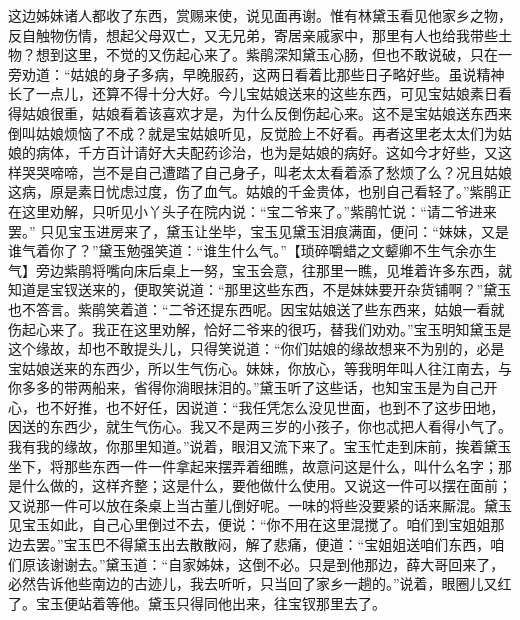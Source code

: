 \documentclass[12pt,oneside]{book}
\begin{document}
这边姊妹诸人都收了东西，赏赐来使，说见面再谢。惟有林黛玉看见他家乡之物，反自触物伤情，想起父母双亡，又无兄弟，寄居亲戚家中，那里有人也给我带些土物？想到这里，不觉的又伤起心来了。紫鹃深知黛玉心肠，但也不敢说破，只在一旁劝道：“姑娘的身子多病，早晚服药，这两日看着比那些日子略好些。虽说精神长了一点儿，还算不得十分大好。今儿宝姑娘送来的这些东西，可见宝姑娘素日看得姑娘很重，姑娘看着该喜欢才是，为什么反倒伤起心来。这不是宝姑娘送东西来倒叫姑娘烦恼了不成？就是宝姑娘听见，反觉脸上不好看。再者这里老太太们为姑娘的病体，千方百计请好大夫配药诊治，也为是姑娘的病好。这如今才好些，又这样哭哭啼啼，岂不是自己遭踏了自己身子，叫老太太看着添了愁烦了么？况且姑娘这病，原是素日忧虑过度，伤了血气。姑娘的千金贵体，也别自己看轻了。”紫鹃正在这里劝解，只听见小丫头子在院内说：“宝二爷来了。”紫鹃忙说：“请二爷进来罢。”
只见宝玉进房来了，黛玉让坐毕，宝玉见黛玉泪痕满面，便问：“妹妹，又是谁气着你了？”黛玉勉强笑道：“谁生什么气。”【琐碎嚼蜡之文颦卿不生气余亦生气】旁边紫鹃将嘴向床后桌上一努，宝玉会意，往那里一瞧，见堆着许多东西，就知道是宝钗送来的，便取笑说道：“那里这些东西，不是妹妹要开杂货铺啊？”黛玉也不答言。紫鹃笑着道：“二爷还提东西呢。因宝姑娘送了些东西来，姑娘一看就伤起心来了。我正在这里劝解，恰好二爷来的很巧，替我们劝劝。”宝玉明知黛玉是这个缘故，却也不敢提头儿，只得笑说道：“你们姑娘的缘故想来不为别的，必是宝姑娘送来的东西少，所以生气伤心。妹妹，你放心，等我明年叫人往江南去，与你多多的带两船来，省得你淌眼抹泪的。”黛玉听了这些话，也知宝玉是为自己开心，也不好推，也不好任，因说道：“我任凭怎么没见世面，也到不了这步田地，因送的东西少，就生气伤心。我又不是两三岁的小孩子，你也忒把人看得小气了。我有我的缘故，你那里知道。”说着，眼泪又流下来了。宝玉忙走到床前，挨着黛玉坐下，将那些东西一件一件拿起来摆弄着细瞧，故意问这是什么，叫什么名字；那是什么做的，这样齐整；这是什么，要他做什么使用。又说这一件可以摆在面前；又说那一件可以放在条桌上当古董儿倒好呢。一味的将些没要紧的话来厮混。黛玉见宝玉如此，自己心里倒过不去，便说：“你不用在这里混搅了。咱们到宝姐姐那边去罢。”宝玉巴不得黛玉出去散散闷，解了悲痛，便道：“宝姐姐送咱们东西，咱们原该谢谢去。”黛玉道：“自家姊妹，这倒不必。只是到他那边，薛大哥回来了，必然告诉他些南边的古迹儿，我去听听，只当回了家乡一趟的。”说着，眼圈儿又红了。宝玉便站着等他。黛玉只得同他出来，往宝钗那里去了。　　
\end{document}
